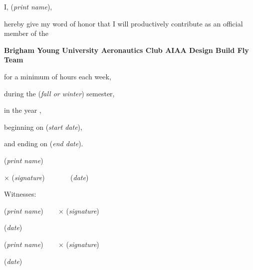 \documentclass[contract]{byu-aero}
\begin{document}
	\vspace*{0.5in}
	\large
	\noindent I, \underline{\hspace{7cm}} (\textit{print name}), 
	
	\noindent hereby give my word of honor that I will productively contribute as an official member of the
	
	\noindent \textbf{Brigham Young University Aeronautics Club AIAA Design Build Fly Team}
	
	\noindent for a minimum of \underline{\hspace{1cm}} hours each week,
	
	\noindent during the \underline{\hspace{2cm}} (\textit{fall or winter}) semester,
	
	\noindent in the year \underline{\hspace{1.5cm}},
	
	\noindent beginning on \underline{\hspace{5cm}} (\textit{start date}),
	
	\noindent and ending on \underline{\hspace{5cm}} (\textit{end date}).
	
	\vspace*{0.5in}
	
	\noindent \underline{\hspace{6cm}} (\textit{print name})
	
	\vspace*{0.25in}
	
	\noindent \(\times\)\underline{\hspace{6cm}} (\textit{signature}) ~~~~~~\underline{\hspace{4cm}} (\textit{date})
	
	\vspace*{0.5in}
	
	\noindent Witnesses:
	
	\noindent \underline{\hspace{4cm}} (\textit{print name}) ~~~
	\(\times\)\underline{\hspace{4cm}} (\textit{signature}) 
	
	\noindent \underline{\hspace{4cm}} (\textit{date})
	
	\vspace*{0.25in}
	
	\noindent \underline{\hspace{4cm}} (\textit{print name}) ~~~
	\(\times\)\underline{\hspace{4cm}} (\textit{signature}) 
	
	\noindent \underline{\hspace{4cm}} (\textit{date})
	
\end{document}

